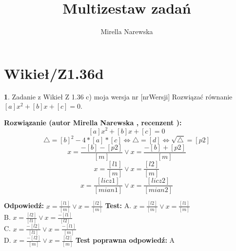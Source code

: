 \documentclass[12pt, a4paper]{article}
\title{Multizestaw zadań}
\author{Mirella Narewska}
\date{}
\theoremstyle{definition} %
\newtheorem{zad}{}
\newcommand{\kategoria}[1]{\section{#1}} %
\newcommand{\zadStart}[1]{\begin{zad}#1\newline} %
\newcommand{\zadStop}{\end{zad}}   %
\newcommand{\rozwStart}[2]{\noindent \textbf{Rozwiązanie (autor #1 , recenzent #2): }\newline} %
\newcommand{\odpStart}{\noindent \textbf{Odpowiedź:}\newline}    %
\newcommand{\odpStop}{\newline}                                             %
\newcommand{\testStart}{\noindent \textbf{Test:}\newline} %
\newcommand{\testStop}{\newline} %
\newcommand{\kluczStart}{\noindent \textbf{Test poprawna odpowiedź:}\newline} %
\newcommand{\kluczStop}{\newline} %
\begin{document}
\maketitle


\kategoria{Wikieł/Z1.36d}
\zadStart{Zadanie z Wikieł Z 1.36 c) moja wersja nr [nrWersji]}
Rozwiązać równanie $[a]x^2+[b]x+[c]=0$.
\zadStop
\rozwStart{Mirella Narewska}{}
$$[a]x^2+[b]x+[c]=0 $$ 
$$\triangle=[b]^2-4*[a]*[c] \Leftrightarrow \triangle=[d] \Leftrightarrow \sqrt{\triangle}=[p2]$$
$$x=\frac{-[b]-[p2]}{[m]} \vee x=\frac{-[b]+[p2]}{[m]}$$
$$x=\frac{[l1]}{[m]} \vee x=\frac{[l2]}{[m]}$$
$$x=\frac{[licz1]}{[mian1]} \vee x=\frac{[licz2]}{[mian2]}$$



\odpStart
$x=\frac{[l1]}{[m]} \vee x=\frac{[l2]}{[m]}$
\odpStop
\testStart
A. $x=\frac{[l2]}{[m]} \vee x=\frac{[l1]}{[m]}$ \\
B. $x=\frac{[l2]}{[l1]} \vee x=\frac{-[l1]}{[l2]}$ \\
C. $x=\frac{-[l2]}{[l1]} \vee x=\frac{-[l1]}{[m]}$ \\
D. $x=\frac{-[l2]}{[m]} \vee x=\frac{[l2]}{[m]}$ 
\testStop
\kluczStart
A
\kluczStop
\end{document}
